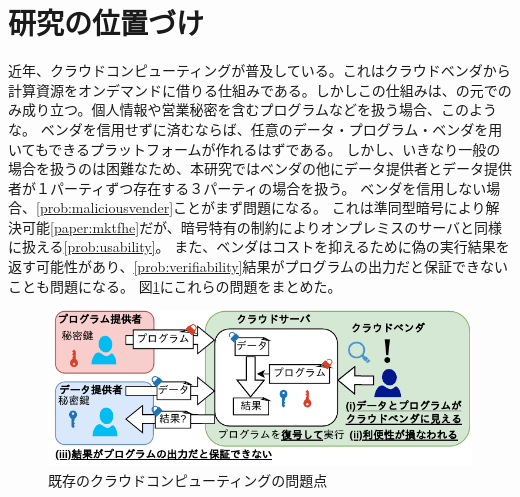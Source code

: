 
\section{研究の位置づけ}


近年、クラウドコンピューティングが普及している。これはクラウドベンダから計算資源をオンデマンドに借りる仕組みである。しかしこの仕組みは、の元でのみ成り立つ。個人情報や営業秘密を含むプログラムなどを扱う場合、このような。
ベンダを信用せずに済むならば、任意のデータ・プログラム・ベンダを用いてもできるプラットフォームが作れるはずである。
しかし、いきなり一般の場合を扱うのは困難なため、本研究ではベンダの他にデータ提供者とデータ提供者が１パーティずつ存在する３パーティの場合を扱う。
ベンダを信用しない場合、\ref{prob:maliciousvender}ことがまず問題になる。
これは準同型暗号により解決可能\ref{paper:mktfhe}だが、暗号特有の制約によりオンプレミスのサーバと同様に扱える\ref{prob:usability}。
また、ベンダはコストを抑えるために偽の実行結果を返す可能性があり、\ref{prob:verifiability}結果がプログラムの出力だと保証できないことも問題になる。
図\ref{fig:problem}にこれらの問題をまとめた。
\begin{figure}[h]
    \centering
    \includegraphics[width=0.8\linewidth]{figures/problem.drawio.pdf}
    \vspace*{-0.5cm}
    \caption{既存のクラウドコンピューティングの問題点}
    \label{fig:problem}
\end{figure}

